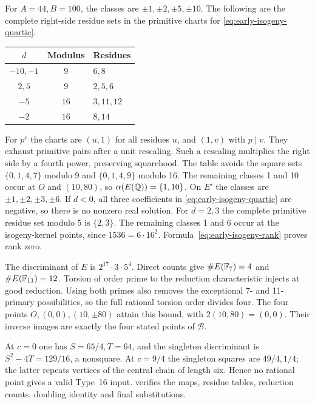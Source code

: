 For $A=44,B=100$, the classes are $\pm1,\pm2,\pm5,\pm10$.
The following are the complete right-side residue sets in the primitive
charts for \eqref{eq:early-isogeny-quartic}.
\begin{center}
\begin{tabular}{ccl}
\toprule
$d$ & Modulus & Residues\\
\midrule
$-10,-1$ & $9$ & $6,8$\\
$2,5$ & $9$ & $2,5,6$\\
$-5$ & $16$ & $3,11,12$\\
$-2$ & $16$ & $8,14$\\
\bottomrule
\end{tabular}
\end{center}
For $p^e$ the charts are $(u,1)$ for all residues $u$, and $(1,v)$
with $p\mid v$. They exhaust primitive pairs after a unit rescaling.
Such a rescaling multiplies the right side by a fourth power, preserving
squarehood. The table avoids the square sets $\{0,1,4,7\}$ modulo 9 and
$\{0,1,4,9\}$ modulo 16. The remaining classes 1 and 10 occur at
$O$ and $(10,80)$, so $\alpha(E(\mathbb Q))=\{1,10\}$.
On $E'$ the classes are $\pm1,\pm2,\pm3,\pm6$. If $d<0$, all three
coefficients in \eqref{eq:early-isogeny-quartic} are negative, so there
is no nonzero real solution. For $d=2,3$ the complete primitive
residue set modulo 5 is $\{2,3\}$. The remaining classes 1 and 6
occur at the isogeny-kernel points, since $1536=6\cdot16^2$.
Formula~\eqref{eq:early-isogeny-rank} proves rank zero.

The discriminant of $E$ is $2^{17}\cdot3\cdot5^4$. Direct counts give
$\#E(\mathbb F_7)=4$ and $\#E(\mathbb F_{11})=12$. Torsion of
order prime to the reduction characteristic injects at good reduction.
Using both primes also removes the exceptional 7- and 11-primary
possibilities, so the full rational torsion order divides four.
The four points $O,(0,0),(10,\pm80)$ attain this bound, with
$2(10,80)=(0,0)$. Their inverse images are exactly the four stated
points of $\mathcal B$.

At $c=0$ one has $S=65/4,T=64$, and the singleton discriminant is
$S^2-4T=129/16$, a nonsquare. At $c=9/4$ the singleton squares are
$49/4,1/4$; the latter repeats vertices of the central chain of length
six. Hence no rational point gives a valid Type~16 input.
 verifies the maps, residue tables,
reduction counts, doubling identity and final substitutions.

